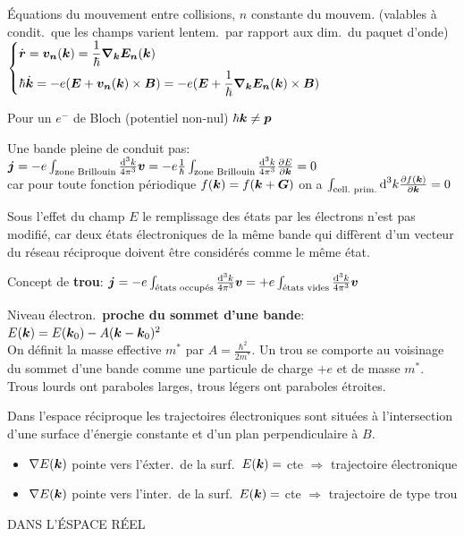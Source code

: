 \begin{squishlist}
    \item Équations du mouvement entre collisions, $n$ constante du mouvem. (valables à condit.\ que les champs varient lentem.\ par rapport aux dim.\ du paquet d'onde)
    $ \left\{ \begin{aligned} 
        & \dot{\vec{r}} = \vec{v_n}(\vk) = \frac{1}{\hbar} \vec{\nabla_\vec{k}E_n}(\vk) \\
        & \hbar \dot{\vec{k}} =  -e (\vec{E} + \vec{v_n}(\vk) \times \vec{B}) =  -e (\vec{E} + \frac{1}{\hbar} \vec{\nabla_\vec{k}E_n}(\vk) \times \vec{B})
    \end{aligned} \right. $
    
    \item Pour un $e^-$ de Bloch (potentiel non-nul) $\hbar \vk \neq \vec{p}$
    \item Une bande pleine de conduit pas: \\
    $\vec{j} = -e \int_{\text{zone Brillouin}} \frac{\ud^3 k}{4 \pi^3}\vec{v} = -e \frac{1}{\hbar} \int_{\text{zone Brillouin}} \frac{\ud^3 k}{4 \pi^3} \D{\vec{k}}{E} = 0$ \\
    car pour toute fonction périodique $f(\vk) = f(\vk + \vG)$ on a $\int_{\text{cell.\ prim.}}\ud^3 k \D{\vk}{f(\vk)} = 0$
    \item Sous l’eﬀet du champ $E$ le remplissage
    des états par les électrons n’est pas modifié, car deux états électroniques de la même bande qui diffèrent d’un vecteur du réseau réciproque doivent être considérés comme le même état.
    \item Concept de \textbf{trou}: $\vec{j} = -e \int_{\text{états occupés}} \frac{\ud^3 k}{4 \pi^3}\vec{v} = +e \int_{\text{états vides}} \frac{\ud^3 k}{4 \pi^3}\vec{v}$
    \item Niveau électron.\ \textbf{proche du sommet d'une bande}: $E(\vk) = E(\vk_0) - A(\vk - \vk_0)^2$ \\
    On définit la masse effective $m^*$ par $A = \frac{\hbar^2}{2m^*}$.
    Un trou se comporte au voisinage du sommet d’une bande
    comme une particule de charge $+e$ et de masse $m^*$. Trous lourds ont paraboles larges, trous légers ont paraboles étroites.

    \item Dans l’espace réciproque les trajectoires électroniques sont situées à l’intersection d’une surface d’énergie constante et d’un plan perpendiculaire à $B$.
    \begin{itemize}
        \item $\nabla E(\vk)$ pointe vers l'éxter.\ de la surf.\ $E(\vk) = $ cte $\Rightarrow$ trajectoire électronique
        \item $\nabla E(\vk)$ pointe vers l'inter.\ de la surf.\ $E(\vk) = $ cte $\Rightarrow$ trajectoire de type trou
    \end{itemize}
    \item DANS L'ÉSPACE RÉEL
\end{squishlist}

